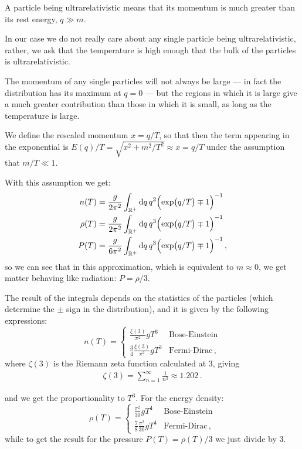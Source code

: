 \documentclass[main.tex]{subfiles}
\begin{document}
A particle being ultrarelativistic means that its momentum is much greater than its rest energy, \(q \gg m\).

In our case we do not really care about any single particle being ultrarelativistic, rather, we ask that the temperature is high enough that the bulk of the particles is ultrarelativistic. 

The momentum of any single particles will not always be large --- in fact the distribution has its maximum at \(q = 0\) --- but the regions in which it is large give a much greater contribution than those in which it is small, as long as the temperature is large.

We define the rescaled momentum \(x = q/T\), so that then the term appearing in the exponential is \(E(q) / T = \sqrt{x^2+ m^2/T^2} \approx x = q/ T \) under the assumption that \(m / T \ll 1\). 


With this assumption we get:
%
\begin{align}
  n(T) &= \frac{g}{2 \pi^2} \int _{\mathbb{R}^{+}} \dd{q} q^2 \qty(\exp(q/T) \mp 1 )^{-1} \\
  \rho (T) &= \frac{g}{2 \pi^2} \int _{\mathbb{R}^{+}} \dd{q} q^3 \qty(\exp(q/T) \mp 1 )^{-1}  \\
  P (T) &= \frac{g}{6 \pi^2} \int _{\mathbb{R}^{+}} \dd{q} q^3 \qty(\exp(q/T) \mp 1 )^{-1} 
\,,
\end{align}
%
so we can see that in this approximation, which is equivalent to \(m \approx 0\), we get matter behaving like radiation: \(P = \rho /3\).  

The result of the integrals depends on the statistics of the particles (which determine the \(\pm\) sign in the distribution), and it is given by the following expressions:
%
\begin{equation}
  n(T) = \begin{cases}
      \displaystyle
      \frac{\xi (3)}{\pi^2} g T^3 & \text{Bose-Einstein}  \\[10pt]
      \displaystyle
      \frac{3}{4}\frac{\xi (3)}{\pi^2} g T^3 & \text{Fermi-Dirac}
  \,,
  \end{cases}
\end{equation}
%
where \(\zeta (3)\) is the Riemann zeta function calculated at 3, giving 
%
\begin{align}
\zeta (3) = \sum _{n=1}^{\infty } \frac{1}{n^3} \approx \num{1.202}
\,.
\end{align}
%

and we get the proportionality to \(T^3\).
For the energy density:
\begin{equation}
    \rho (T) = \begin{cases}
        \displaystyle
        \frac{\pi^2}{30} g T^4 & \text{Bose-Einstein}  \\[10pt]
        \displaystyle
        \frac{7}{8}\frac{\pi^2}{30} g T^4 & \text{Fermi-Dirac}  
    \,,
    \end{cases}
\end{equation}
while to get the result for the pressure \(P(T) = \rho (T) / 3\) we just divide by 3.
\end{document}
